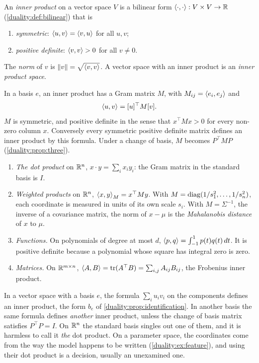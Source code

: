 \begin{notechapter}
\begin{definition}\label{inner-products:def:inner}
An \emph{inner product} on a vector space $V$ is a bilinear form
$\left\langle \cdot, \cdot \right\rangle:V\times V\to\mathbb{R}$ (\cref{duality:def:bilinear}) that is
\begin{enumerate}[nosep]
  \item \emph{symmetric}: $\left\langle u, v \right\rangle = \left\langle v, u \right\rangle$ for all $u, v$;
  \item \emph{positive definite}: $\left\langle v, v \right\rangle > 0$ for all $v\neq0$.
\end{enumerate}
The \emph{norm} of $v$ is $\left\|v\right\| = \sqrt{\left\langle v, v \right\rangle}$. A vector space with
an inner product is an \emph{inner product space}.
\end{definition}

In a basis $e$, an inner product has a Gram matrix $M$, with
$M_{ij} = \left\langle e_i, e_j \right\rangle$ and
\[
  \left\langle u, v \right\rangle = [u]^\top M[v] .
\]
$M$ is symmetric, and positive definite in the sense that
$x^\top Mx > 0$ for every non-zero column $x$. Conversely every symmetric
positive definite matrix defines an inner product by this formula. Under
a change of basis, $M$ becomes $P^\top MP$ (\cref{duality:prop:three}).

\begin{example}\label{inner-products:ex:examples}
\begin{enumerate}[nosep]
  \item \emph{The dot product} on $\mathbb{R}^n$, $x\cdot y = \sum_ix_iy_i$: the
        Gram matrix in the standard basis is $I$.
  \item \emph{Weighted products} on $\mathbb{R}^n$, $\left\langle x, y \right\rangle_M = x^\top My$. With
        $M = \operatorname{diag}(1/s_1^2,\dots,1/s_n^2)$, each coordinate is measured in
        units of its own scale $s_i$. With $M = \Sigma^{-1}$, the inverse
        of a covariance matrix, the norm of $x - \mu$ is the
        \emph{Mahalanobis distance} of $x$ to $\mu$.
  \item \emph{Functions.} On polynomials of degree at most $d$,
        $\left\langle p, q \right\rangle = \int_{-1}^1p(t)q(t)\,dt$. It is positive definite
        because a polynomial whose square has integral zero is zero.
  \item \emph{Matrices.} On $\mathbb{R}^{m\times n}$,
        $\left\langle A, B \right\rangle = \operatorname{tr}(A^\top B) = \sum_{i,j}A_{ij}B_{ij}$, the Frobenius
        inner product.
\end{enumerate}
\end{example}

\begin{pitfall}
In a vector space with a basis $e$, the formula $\sum_iu_iv_i$ on the
components defines an inner product, the form $b_e$ of
\cref{duality:prop:identification}. In another basis the same formula
defines \emph{another} inner product, unless the change of basis matrix
satisfies $P^\top P = I$. On $\mathbb{R}^n$ the standard basis singles out one of
them, and it is harmless to call it \emph{the} dot product. On a parameter
space, the coordinates come from the way the model happens to be written
(\cref{duality:ex:feature}), and using their dot product is a decision,
usually an unexamined one.
\end{pitfall}


\end{notechapter}
